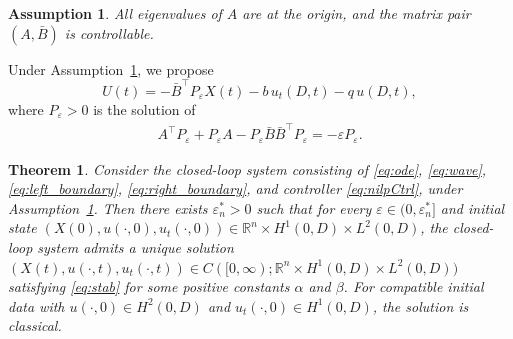 \documentclass{IEEEtran}
\newtheorem{theorem}{Theorem}[section]
\newtheorem{assumption}{Assumption}[section]
\theoremstyle{definition}
\begin{document}
\begin{assumption}
\label{ass:nilp}
All eigenvalues of $A$ are at the origin, and the matrix pair
$(A,\bar B)$ is controllable.
\end{assumption}

Under Assumption~\ref{ass:nilp}, we propose
\begin{equation}
U(t)=-\bar B^\top P_\varepsilon X(t)-b\,u_t(D,t)-q\,u(D,t),
\label{eq:nilpCtrl}
\end{equation}
where $P_\varepsilon>0$ is the solution of
\begin{equation}
\begin{aligned}
 A^\top P_\varepsilon+P_\varepsilon A
 -P_\varepsilon\bar B\bar B^\top P_\varepsilon
 =-\varepsilon P_\varepsilon.
\end{aligned}
\label{eq:nilp_are}
\end{equation}

\begin{theorem}
\label{thm2}
Consider the closed-loop system consisting of \eqref{eq:ode},
\eqref{eq:wave}, \eqref{eq:left_boundary},
\eqref{eq:right_boundary}, and controller \eqref{eq:nilpCtrl}, under
Assumption~\ref{ass:nilp}. Then there exists $\varepsilon_n^*>0$
such that for every $\varepsilon\in(0,\varepsilon_n^*]$ and initial state
$(X(0),u(\cdot,0),u_t(\cdot,0))\in
\mathbb R^n\times H^1(0,D)\times L^2(0,D)$, the closed-loop
system admits a unique solution
$(X(t),u(\cdot,t),u_t(\cdot,t))\in
C([0,\infty);\mathbb R^n\times H^1(0,D)\times L^2(0,D))$
satisfying \eqref{eq:stab} for some positive
constants $\alpha$ and $\beta$. For compatible initial data with
$u(\cdot,0)\in H^2(0,D)$ and $u_t(\cdot,0)\in H^1(0,D)$,
the solution is classical.
\end{theorem}
\end{document}
